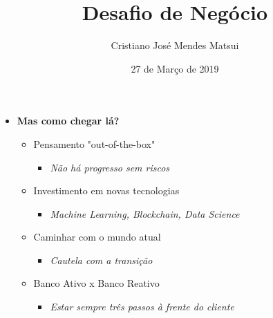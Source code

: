 \documentclass{beamer}
\begin{document}
\begin{frame}
 
    \begin{itemize}
     \item[] \textbf{Mas como chegar lá?}\newline

	\begin{itemize}
	  \item[] Pensamento "out-of-the-box"
	  \begin{itemize}
	      \item[] \textit{Não há progresso sem riscos}\newline
	  \end{itemize}
	  \item[] Investimento em novas tecnologias
	   \begin{itemize}
	      \item[] \textit{Machine Learning, Blockchain, Data Science}\newline
	   \end{itemize}
	  \item[] Caminhar com o mundo atual 
	    \begin{itemize}
		\item[] \textit{Cautela com a transição}\newline
	    \end{itemize}
	 \item[] Banco Ativo x Banco Reativo
	    \begin{itemize}
		\item[] \textit{Estar sempre três passos à frente do cliente}
	    \end{itemize}
	   
	\end{itemize}


    \end{itemize}

 
\end{frame}





\title{Desafio de Negócio}

\author{
Cristiano José Mendes Matsui\\
}
\date{27 de Março de 2019}
\end{document}
